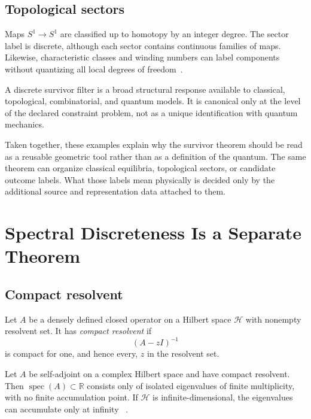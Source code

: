 \documentclass[11pt]{article}
\newcommand{\Hilb}{\mathcal H}
\newcommand{\spec}{\operatorname{spec}}
\begin{document}
\subsection{Topological sectors}

Maps $S^1\to S^1$ are classified up to homotopy by an integer degree.  The
sector label is discrete, although each sector contains continuous families of
maps.  Likewise, characteristic classes and winding numbers can label
components without quantizing all local degrees of freedom~\cite{Hatcher}.

\begin{remark}
A discrete survivor filter is a broad structural response available to
classical, topological, combinatorial, and quantum models.  It is canonical
only at the level of the declared constraint problem, not as a unique
identification with quantum mechanics.
\end{remark}

Taken together, these examples explain why the survivor theorem should be
read as a reusable geometric tool rather than as a definition of the quantum.
The same theorem can organize classical equilibria, topological sectors, or
candidate outcome labels.  What those labels mean physically is decided only
by the additional source and representation data attached to them.

\section{Spectral Discreteness Is a Separate Theorem}

\subsection{Compact resolvent}

\begin{definition}
Let $A$ be a densely defined closed operator on a Hilbert space $\Hilb$ with
nonempty resolvent set.  It has \emph{compact resolvent} if
\[
 (A-zI)^{-1}
\]
is compact for one, and hence every, $z$ in the resolvent set.
\end{definition}

\begin{theorem}
\label{thm:compact-resolvent}
Let $A$ be self-adjoint on a complex Hilbert space and have compact resolvent.
Then $\spec(A)\subset\mathbb R$ consists only of isolated eigenvalues of finite
multiplicity, with no finite accumulation point.  If $\Hilb$ is
infinite-dimensional, the eigenvalues can accumulate only at infinity
~\cite{ReedSimon,Conway}.
\end{theorem}
\end{document}
